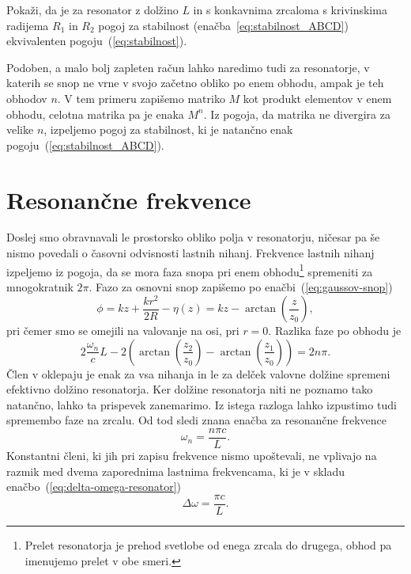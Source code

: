 \begin{definition}
Pokaži, da je za resonator z dolžino $L$ in s konkavnima zrcaloma s krivinskima radijema $R_1$ in $R_2$ 
pogoj za stabilnost (enačba~\ref{eq:stabilnost_ABCD}) ekvivalenten pogoju~(\ref{eq:stabilnost}).
\end{definition}

\begin{remark}
Podoben, a malo bolj zapleten račun lahko naredimo tudi za resonatorje, v katerih se snop 
ne vrne v svojo začetno obliko po enem obhodu, ampak je teh obhodov $n$. V tem primeru zapišemo
matriko $M$ kot produkt elementov v enem obhodu, celotna matrika pa je enaka $M^n$. Iz pogoja,
da matrika ne divergira za velike $n$, izpeljemo pogoj za stabilnost, ki je natančno 
enak pogoju~(\ref{eq:stabilnost_ABCD}). 
\end{remark}

\section{Resonančne frekvence}
Doslej smo obravnavali le prostorsko obliko polja v resonatorju, ničesar pa še nismo
povedali o časovni odvisnosti lastnih nihanj. Frekvence
lastnih nihanj izpeljemo iz pogoja, 
da se mora faza snopa pri enem obhodu\footnote{Prelet resonatorja je prehod svetlobe od enega zrcala
do drugega, obhod pa imenujemo prelet v obe smeri.}
spremeniti za mnogokratnik
$2\pi$. Fazo za osnovni snop zapišemo po enačbi~(\ref{eq:gaussov-snop})
\begin{equation}
\phi = kz+\frac{kr^{2}}{2R} -\eta(z) = kz-\arctan \left(\frac{z}{z_{0}}\right),
\label{eq:fazag}
\end{equation}
pri čemer  smo se omejili na valovanje na osi, pri $r=0$. 
Razlika faze po obhodu je 
\begin{equation}
2\frac{\omega_{n}}{c}L-2\left(\arctan \left(\frac{z_{2}}{z_{0}}\right)-
\arctan\left(\frac{z_{1}}{z_{0}}\right)\right)=2n\pi.
\label{eq:fazan}
\end{equation}
Člen v oklepaju je enak za vsa nihanja in le za delček valovne dolžine 
spremeni efektivno dolžino resonatorja. Ker dolžine resonatorja niti ne poznamo
tako natančno, lahko ta prispevek zanemarimo. Iz istega razloga lahko izpustimo
tudi spremembo faze na zrcalu. Od tod sledi znana enačba za resonančne frekvence 
\begin{equation}
\omega_{n}=\frac{n\pi c}{L}.
\label{eq:omega}
\end{equation}
Konstantni členi, ki jih pri zapisu frekvence nismo upoštevali, ne vplivajo
na razmik med dvema zaporednima lastnima frekvencama, ki je v skladu
enačbo~(\ref{eq:delta-omega-resonator})
\begin{equation}
\Delta\omega=\frac{\pi c}{L}.
\label{eq:deltaomega}
\end{equation}

